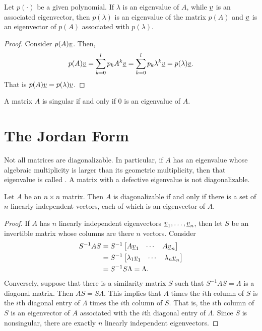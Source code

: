 \begin{theorem}
Let $p( \cdot )$ be a given polynomial.
If $\lambda$ is an eigenvalue of $A$, while $\underline{v}$ is an associated eigenvector, then $p ( \lambda )$ is an eigenvalue of the matrix $p (A)$ and $\underline{v}$ is an eigenvector of $p(A)$ associated with $p(\lambda)$.
\end{theorem}
\begin{proof}
Consider $p(A) \underline{v}$.
Then,
\begin{equation*}
p( A ) \underline{v} = \sum_{k=0}^l p_k A^k \underline{v}
= \sum_{k=0}^l p_k \lambda^k \underline{v}
= p( \lambda ) \underline{v} .
\end{equation*}
That is $p(A) \underline{v} = p( \lambda ) \underline{v}$.
\end{proof}

A matrix $A$ is singular if and only if $0$ is an eigenvalue of $A$.

\section{The Jordan Form}

Not all matrices are diagonalizable.
In particular, if $A$ has an eigenvalue whose algebraic multiplicity is larger than its geometric multiplicity, then that eigenvalue is called .
A matrix with a defective eigenvalue is not diagonalizable.

\begin{theorem}
Let $A$ be an $n \times n$ matrix.
Then $A$ is diagonalizable if and only if there is a set of $n$ linearly independent vectors, each of which is an eigenvector of $A$.
\end{theorem}

\begin{proof}
If $A$ has $n$ linearly independent eigenvectors $\underline{v}_1, \ldots, \underline{v}_n$, then let $S$ be an invertible matrix whose columns are there $n$ vectors.
Consider
\begin{equation*}
\begin{split}
S^{-1} A S &= S^{-1} \begin{bmatrix} A \underline{v}_1 & \cdots & A \underline{v}_n \end{bmatrix} \\
&= S^{-1} \begin{bmatrix} \lambda_1 \underline{v}_1 & \cdots & \lambda_n \underline{v}_n \end{bmatrix} \\
&= S^{-1} S \Lambda = \Lambda .
\end{split}
\end{equation*}
Conversely, suppose that there is a similarity matrix $S$ such that $S^{-1} A S = \Lambda$ is a diagonal matrix.
Then $A S = S \Lambda$.
This implies that $A$ times the $i$th column of $S$ is the $i$th diagonal entry of $\Lambda$ times the $i$th column of $S$.
That is, the $i$th column of $S$ is an eigenvector of $A$ associated with the $i$th diagonal entry of $\Lambda$.
Since $S$ is nonsingular, there are exactly $n$ linearly independent eigenvectors.
\end{proof}

